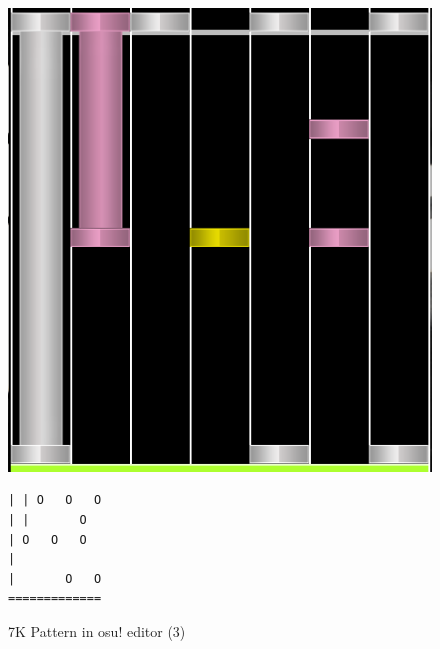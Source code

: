 \begin{figure}[H]
    \centering
    \begin{minipage}{.5\textwidth}
        \centering
        \includegraphics[scale=0.3]{imgs/osupattern3}
    \end{minipage}%
    \begin{minipage}{0.5\textwidth}
        \centering
        \begin{verbatim}
| | O   O   O
| |       O
| O   O   O
|
|       O   O
=============
        \end{verbatim}
    \end{minipage}
    \caption{7K Pattern in osu! editor (3)}
    \label{fig:osupattern3}
\end{figure}

